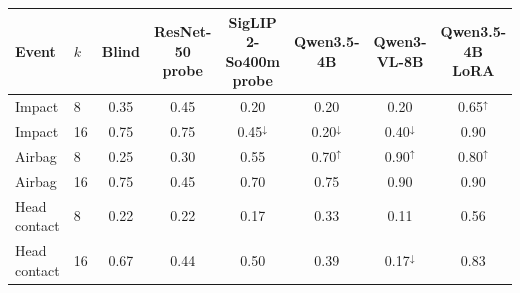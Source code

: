 \begin{tabular}{llcccccc}
\toprule
Event & $k$ & Blind & ResNet-50 probe & SigLIP 2-So400m probe & Qwen3.5-4B & Qwen3-VL-8B & Qwen3.5-4B LoRA \\
\midrule
Impact & 8 & 0.35 & 0.45 & 0.20 & 0.20 & 0.20 & 0.65$^{\uparrow}$ \\
Impact & 16 & 0.75 & 0.75 & 0.45$^{\downarrow}$ & 0.20$^{\downarrow}$ & 0.40$^{\downarrow}$ & 0.90 \\
Airbag & 8 & 0.25 & 0.30 & 0.55 & 0.70$^{\uparrow}$ & 0.90$^{\uparrow}$ & 0.80$^{\uparrow}$ \\
Airbag & 16 & 0.75 & 0.45 & 0.70 & 0.75 & 0.90 & 0.90 \\
Head contact & 8 & 0.22 & 0.22 & 0.17 & 0.33 & 0.11 & 0.56 \\
Head contact & 16 & 0.67 & 0.44 & 0.50 & 0.39 & 0.17$^{\downarrow}$ & 0.83 \\
\bottomrule
\end{tabular}
